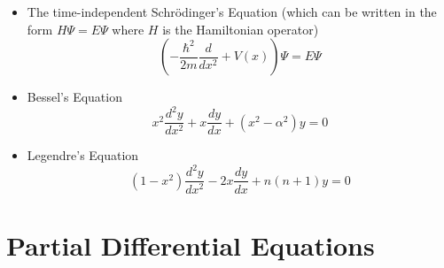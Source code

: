 \documentclass{report}
\theoremstyle{definition}
\theoremstyle{remark}
\newcommand{\od}[2]{\frac{d #1}{d#2}}
\newcommand{\odt}[2]{\frac{d^2 #1}{d#2^2}}
\begin{document}
\begin{itemize}
    \item The time-independent Schr\"odinger's Equation (which can be written in the form $H\Psi = E\Psi$ where $H$ is the Hamiltonian operator)
    \begin{equation*}
        \left(-\frac{\hbar^2}{2m} \od{}{x^2}+V(x)\right)\Psi = E\Psi
    \end{equation*}
    \item Bessel's Equation 
    \begin{equation*}
        x^2\odt{y}{x}+x\od{y}{x}+(x^2-\alpha^2)y=0
    \end{equation*}
    \item Legendre's Equation 
    \begin{equation*}
        (1-x^2)\odt{y}{x}-2x\od{y}{x}+n(n+1)y=0
    \end{equation*}
\end{itemize}



\chapter{Partial Differential Equations}
\end{document}
